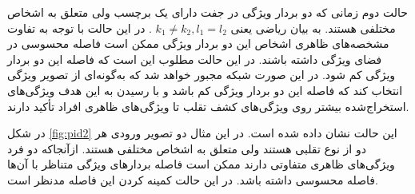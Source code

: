 حالت دوم زمانی که دو بردار ویژگی در جفت دارای یک برچسب ولی متعلق به اشخاص مختلفی هستند. به بیان ریاضی یعنی  
  $k_1 \ne k_2 , l_1 = l_2 $
. در این حالت با توجه به تفاوت مشخصه‌های ظاهری اشخاص این دو بردار ویژگی ممکن است فاصله محسوسی در فضای ویژگی داشته باشند. در این حالت مطلوب این است که فاصله این دو بردار ویژگی کم شود. در این صورت شبکه مجبور خواهد شد که به‌گونه‌ای از تصویر ویژگی انتخاب کند که فاصله این دو بردار ویژگی کم باشد و با رسیدن به این هدف ویژگی‌های استخراج‌شده بیشتر روی ویژگی‌های کشف تقلب تا ویژگی‌های ظاهری افراد تأکید دارند.

در شکل
\ref{fig:pid2}
این حالت نشان داده شده است. در این مثال دو تصویر ورودی هر دو از نوع تقلبی هستند ولی متعلق به اشخاص مختلفی هستند. از‌آنجا‌که دو فرد ویژگی‌های ظاهری متفاوتی دارند ممکن است فاصله بردارهای ویژگی متناظر با آن‌ها فاصله محسوسی داشته باشد. در این حالت کمینه کردن این فاصله مد‌نظر است. 
